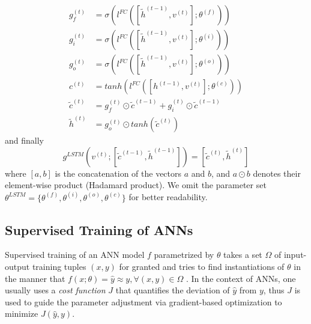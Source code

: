 \begin{equation} \label{eq:lstm_interm}
\begin{split}
g_f^{(t)} & = \sigma(l^{FC}([\tilde{h}^{(t-1)}, v^{(t)}]; \theta^{(f)})) \\
g_i^{(t)} & = \sigma(l^{FC}([\tilde{h}^{(t-1)}, v^{(t)}]; \theta^{(i)})) \\
g_o^{(t)} & = \sigma(l^{FC}([\tilde{h}^{(t-1)}, v^{(t)}]; \theta^{(o)})) \\
c^{(t)} & = tanh(l^{FC}([h^{(t-1)}, v^{(t)}]; \theta^{(c)})) \\
\tilde{c}^{(t)} & = g_f^{(t)} \odot \tilde{c}^{(t-1)} + g_i^{(t)} \odot \tilde{c}^{(t-1)} \\
\tilde{h}^{(t)} & = g_o^{(t)} \odot tanh(\tilde{c}^{(t)})
\end{split}
\end{equation}
and finally
\begin{equation} \label{eq:lstm}
g^{LSTM}(v^{(t)};[\tilde{c}^{(t-1)}, \tilde{h}^{(t-1)}]) = [\tilde{c}^{(t)}, \tilde{h}^{(t)}]
\end{equation}
where $[a, b]$ is the concatenation of the vectors $a$ and $b$, and $a \odot b$ denotes their element-wise  product (Hadamard product). We omit the parameter set $\theta^{LSTM} = \{\theta^{(f)}, \theta^{(i)}, \theta^{(o)}, \theta^{(c)}\}$ for better readability.

\subsection{Supervised Training of ANNs}
Supervised training of an \ac{ANN} model $f$ parametrized by $\theta$ takes a set $\Omega$ of input-output training tuples $(x,y)$ for granted and tries to find instantiations of $\theta$ in the manner that $f(x;\theta) = \hat{y} \approx y, \forall (x,y) \in \Omega$ \autocite{mohri_foundations_2012}. In the context of \ac{ANN}s, one usually uses a \textit{cost function} $J$ that quantifies the deviation of $\hat{y}$ from $y$, thus $J$ is used to guide the parameter adjustment via gradient-based optimization to minimize $J(\hat{y}, y)$.

